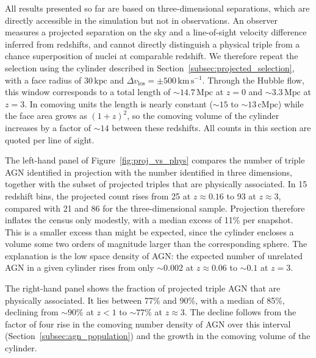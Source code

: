 \documentclass[twocolumn, 10pt]{article}
\begin{document}
All results presented so far are based on three-dimensional separations, which are directly accessible in the simulation but not in observations. An observer measures a projected separation on the sky and a line-of-sight velocity difference inferred from redshifts, and cannot directly distinguish a physical triple from a chance superposition of nuclei at comparable redshift. We therefore repeat the selection using the cylinder described in Section~\ref{subsec:projected_selection}, with a face radius of $30\,\mathrm{kpc}$ and $\Delta v_\mathrm{los} = \pm 500\,\mathrm{km\,s^{-1}}$. Through the Hubble flow, this window corresponds to a total length of $\sim 14.7\,\mathrm{Mpc}$ at $z = 0$ and $\sim 3.3\,\mathrm{Mpc}$ at $z = 3$. In comoving units the length is nearly constant ($\sim 15$ to $\sim 13\,\mathrm{cMpc}$) while the face area grows as $(1+z)^2$, so the comoving volume of the cylinder increases by a factor of $\sim 14$ between these redshifts. All counts in this section are quoted per line of sight.

The left-hand panel of Figure~\ref{fig:proj_vs_phys} compares the number of triple AGN identified in projection with the number identified in three dimensions, together with the subset of projected triples that are physically associated. In 15 redshift bins, the projected count rises from 25 at $z \approx 0.16$ to 93 at $z \approx 3$, compared with 21 and 86 for the three-dimensional sample. Projection therefore inflates the census only modestly, with a median excess of 11\% per snapshot. This is a smaller excess than might be expected, since the cylinder encloses a volume some two orders of magnitude larger than the corresponding sphere. The explanation is the low space density of AGN: the expected number of unrelated AGN in a given cylinder rises from only $\sim 0.002$ at $z \approx 0.06$ to $\sim 0.1$ at $z = 3$.

The right-hand panel shows the fraction of projected triple AGN that are physically associated. It lies between 77\% and 90\%, with a median of 85\%, declining from $\sim 90\%$ at $z < 1$ to $\sim 77\%$ at $z \approx 3$. The decline follows from the factor of four rise in the comoving number density of AGN over this interval (Section~\ref{subsec:agn_population}) and the growth in the comoving volume of the cylinder.
\end{document}
